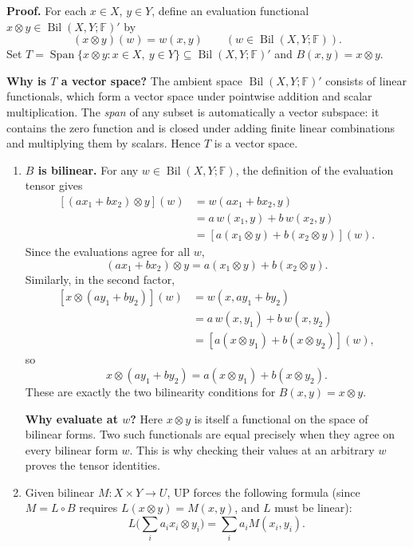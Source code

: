 \documentclass[11pt,a4paper]{article}
\newcommand{\F}{\mathbb F}
\newenvironment{proofsteps}{\begin{enumerate}\setlength{\itemsep}{4pt}}{\end{enumerate}}
\begin{document}
\textbf{Proof.} For each \(x\in X\), \(y\in Y\), define an evaluation functional
\(x\otimes y\in\operatorname{Bil}(X,Y;\F)'\) by
\[
(x\otimes y)(w)=w(x,y)\qquad(w\in\operatorname{Bil}(X,Y;\F)).
\]
Set \(T=\operatorname{Span}\{x\otimes y:x\in X,\ y\in Y\}\subseteq\operatorname{Bil}(X,Y;\F)'\) and \(B(x,y)=x\otimes y\).
\begin{personalnote}
\textbf{Why is \(T\) a vector space?} The ambient space \(\operatorname{Bil}(X,Y;\F)'\) consists of linear functionals, which form a vector space under pointwise addition and scalar multiplication. The \emph{span} of any subset is automatically a vector subspace: it contains the zero function and is closed under adding finite linear combinations and multiplying them by scalars. Hence \(T\) is a vector space.
\end{personalnote}
\begin{proofsteps}
\item \textbf{\(B\) is bilinear.} For any \(w\in\operatorname{Bil}(X,Y;\F)\), the definition of the evaluation tensor gives
\[
 \begin{aligned}
 [(ax_1+bx_2)\otimes y](w)
 &=w(ax_1+bx_2,y)\\
 &=a\,w(x_1,y)+b\,w(x_2,y)\\
 &=[a(x_1\otimes y)+b(x_2\otimes y)](w).
 \end{aligned}
\]
Since the evaluations agree for all \(w\),
\[
 \boxed{(ax_1+bx_2)\otimes y=a(x_1\otimes y)+b(x_2\otimes y).}
\]
Similarly, in the second factor,
\[
 \begin{aligned}
 [x\otimes(ay_1+by_2)](w)
 &=w(x,ay_1+by_2)\\
 &=a\,w(x,y_1)+b\,w(x,y_2)\\
 &=[a(x\otimes y_1)+b(x\otimes y_2)](w),
 \end{aligned}
\]
so
\[
 \boxed{x\otimes(ay_1+by_2)=a(x\otimes y_1)+b(x\otimes y_2).}
\]
These are exactly the two bilinearity conditions for \(B(x,y)=x\otimes y\).
\begin{personalnote}
\textbf{Why evaluate at \(w\)?} Here \(x\otimes y\) is itself a functional on the space of bilinear forms. Two such functionals are equal precisely when they agree on every bilinear form \(w\). This is why checking their values at an arbitrary \(w\) proves the tensor identities.
\end{personalnote}
\item Given bilinear \(M:X\times Y\to U\), UP forces the following formula (since \(M=L\circ B\) requires \(L(x\otimes y)=M(x,y)\), and \(L\) must be linear):
\[
L\Big(\sum_i a_ix_i\otimes y_i\Big)=\sum_i a_iM(x_i,y_i). \tag{*}
\]
\end{proofsteps}
\end{document}

